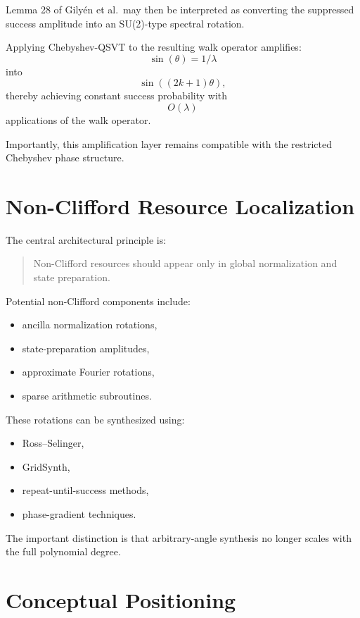 \documentclass[12pt,a4paper]{article}
\begin{document}
Lemma 28 of Gily\'en et al.\ may then be interpreted as converting the suppressed success amplitude into an SU(2)-type spectral rotation.

Applying Chebyshev-QSVT to the resulting walk operator amplifies:
\[
\sin(\theta)
=
1/\lambda
\]
into
\[
\sin((2k+1)\theta),
\]
thereby achieving constant success probability with
\[
O(\lambda)
\]
applications of the walk operator.

Importantly, this amplification layer remains compatible with the restricted Chebyshev phase structure.


\section{Non-Clifford Resource Localization}

The central architectural principle is:

\begin{quote}
Non-Clifford resources should appear only in global normalization and state preparation.
\end{quote}

Potential non-Clifford components include:

\begin{itemize}
    \item ancilla normalization rotations,
    \item state-preparation amplitudes,
    \item approximate Fourier rotations,
    \item sparse arithmetic subroutines.
\end{itemize}

These rotations can be synthesized using:
\begin{itemize}
    \item Ross--Selinger,
    \item GridSynth,
    \item repeat-until-success methods,
    \item phase-gradient techniques.
\end{itemize}

The important distinction is that arbitrary-angle synthesis no longer scales with the full polynomial degree.


\section{Conceptual Positioning}
\end{document}
